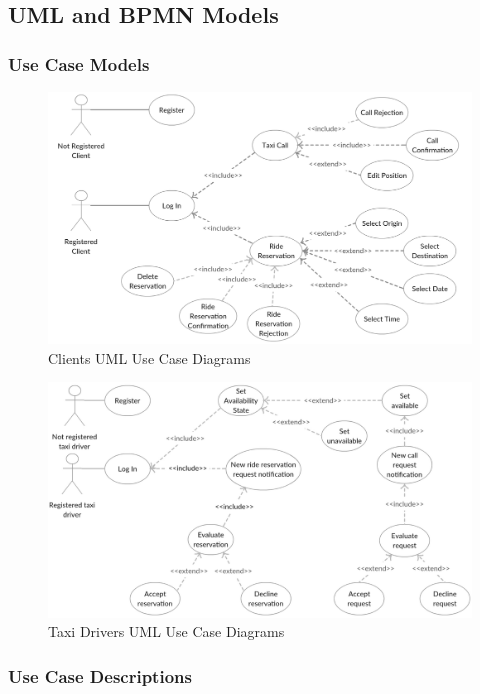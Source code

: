 \documentclass[a4paper]{article}
\begin{document}
\subsection{UML and BPMN Models}


\subsubsection{Use Case Models}

\begin{figure}[H]
\includegraphics[width=\textwidth]{UseCase-Client}
\centering
\caption{Clients UML Use Case Diagrams}
\label{fig:usecaseclient}
\end{figure}

\vfill

\begin{figure}[H]
\includegraphics[width=\textwidth]{UseCase-TaxiDriver}
\centering
\caption{Taxi Drivers UML Use Case Diagrams}
\label{fig:usecasetaxidriver}
\end{figure}

\subsubsection{Use Case Descriptions}
\end{document}
